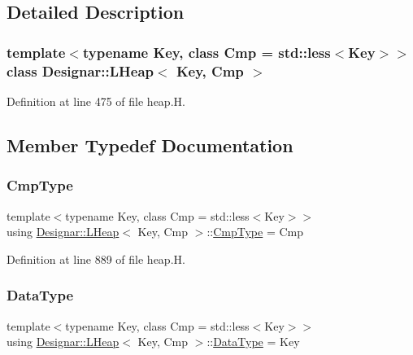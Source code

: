 \subsection{Detailed Description}
\subsubsection*{template$<$typename Key, class Cmp = std\+::less$<$\+Key$>$$>$\newline
class Designar\+::\+L\+Heap$<$ Key, Cmp $>$}



Definition at line 475 of file heap.\+H.



\subsection{Member Typedef Documentation}
\mbox{\label{class_designar_1_1_l_heap_abb2b4f1228557317e5c3188771aea09c}} 
\subsubsection{\texorpdfstring{Cmp\+Type}{CmpType}}
{\footnotesize\ttfamily template$<$typename Key, class Cmp = std\+::less$<$\+Key$>$$>$ \\
using \hyperlink{class_designar_1_1_l_heap}{Designar\+::\+L\+Heap}$<$ Key, Cmp $>$\+::\hyperlink{class_designar_1_1_l_heap_abb2b4f1228557317e5c3188771aea09c}{Cmp\+Type} =  Cmp}



Definition at line 889 of file heap.\+H.

\mbox{\label{class_designar_1_1_l_heap_abacf82fc0de24e3d5954b075e3fb74b5}} 
\subsubsection{\texorpdfstring{Data\+Type}{DataType}}
{\footnotesize\ttfamily template$<$typename Key, class Cmp = std\+::less$<$\+Key$>$$>$ \\
using \hyperlink{class_designar_1_1_l_heap}{Designar\+::\+L\+Heap}$<$ Key, Cmp $>$\+::\hyperlink{class_designar_1_1_l_heap_abacf82fc0de24e3d5954b075e3fb74b5}{Data\+Type} =  Key}




